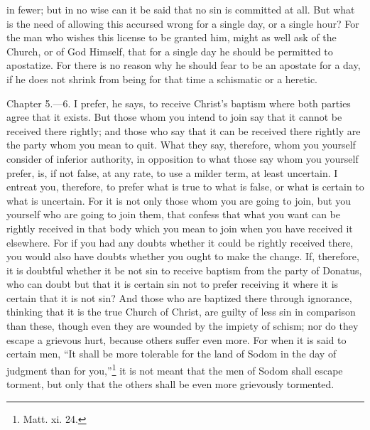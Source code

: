 in fewer; but in no wise can it be said that no sin is committed at all. But what is the need of allowing this accursed wrong for a single day, or a single hour? For the man who wishes this license to be granted him, might as well ask of the Church, or of God Himself, that for a single day he should be permitted to apostatize. For there is no reason why he should fear to be an apostate for a day, if he does not shrink from being for that time a schismatic or a heretic.


Chapter 5.—6. I prefer, he says, to receive Christ’s baptism where both parties agree that it exists. But those whom you intend to join say that it cannot be received there rightly; and those who say that it can be received there rightly are the party whom you mean to quit. What they say, therefore, whom you yourself consider of inferior authority, in opposition to what those say whom you yourself prefer, is, if not false, at any rate, to use a milder term, at least uncertain. I entreat you, therefore, to prefer what is true to what is false, or what is certain to what is uncertain. For it is not only those whom you are going to join, but you yourself who are going to join them, that confess that what you want can be rightly received in that body which you mean to join when you have received it elsewhere. For if you had any doubts whether it could be rightly received there, you would also have doubts whether you ought to make the change. If, therefore, it is doubtful whether it be not sin to receive baptism from the party of Donatus, who can doubt but that it is certain sin not to prefer receiving it where it is certain that it is not sin? And those who are baptized there through ignorance, thinking that it is the true Church of Christ, are guilty of less sin in comparison than these, though even they are wounded by the impiety of schism; nor do they escape a grievous hurt, because others suffer even more. For when it is said to certain men, ``It shall be more tolerable for the land of Sodom in the day of judgment than for you,''\footnote{\par  Matt. xi. 24.} it is not meant that the men of Sodom shall escape torment, but only that the others shall be even more grievously tormented.

